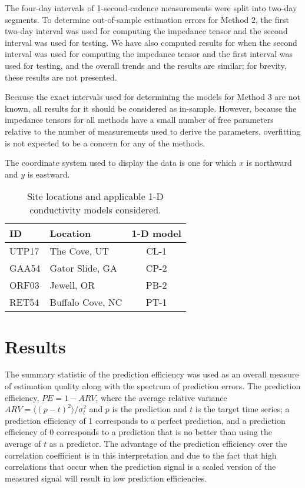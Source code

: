 \documentclass[12pt]{article}
\providecommand{\DIFaddbegin}{} %
\providecommand{\DIFaddend}{} %
\begin{document}
\DIFaddbegin 

\DIFaddend The four-day intervals of 1-second-cadence measurements were split into two-day segments.  To determine out-of-sample estimation errors for Method 2, the first two-day interval was used for computing the impedance tensor and the second interval was used for testing. We have also computed results for when the second interval was used for computing the impedance tensor and the first interval was used for testing, and the overall trends and the results are similar; for brevity, these results are not presented.

Because the exact intervals used for determining the models for Method 3 are not known, all results for it should be considered as in-sample. However, because the impedance tensors for all methods have a small number of free parameters relative to the number of measurements used to derive the parameters, overfitting is not expected to be a concern for any of the methods.

The coordinate system used to display the data is one for which $x$ is northward and $y$ is eastward.

\begin{table}
\centering
\begin{tabular}{ l | l | c }
  ID    & Location & 1-D model \\
  \hline
  UTP17 & The Cove, UT & CL-1 \\
  GAA54 & Gator Slide, GA & CP-2 \\
  ORF03 & Jewell, OR & PB-2 \\
  RET54 & Buffalo Cove, NC & PT-1
\end{tabular}
\caption{Site locations and applicable 1-D conductivity models considered.}
\label{table:SiteLocations}
\end{table}

\section{Results}

The summary statistic of the prediction efficiency was used as an overall measure of estimation quality along with the spectrum of prediction errors.  The prediction efficiency, $PE = 1-ARV$, where the average relative variance $ARV = \langle(p-t)^2\rangle/\sigma_{t}^2$ and $p$ is the prediction and $t$ is the target time series; a prediction efficiency of 1 corresponds to a perfect prediction, and a prediction efficiency of 0 corresponds to a prediction that is no better than using the average of $t$ as a predictor.  The advantage of the prediction efficiency over the correlation coefficient is in this interpretation and due to the fact that high correlations that occur when the prediction signal is a scaled version of the measured signal will result in low prediction efficiencies.
\end{document}
